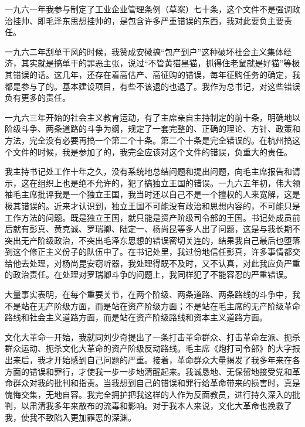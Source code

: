 \begin{maonote}
一九六一年我参与制定了工业企业管理条例（草案）七十条，这个文件不是强调政治挂帅、即毛泽东思想挂帅的，是包含许多严重错误的东西，我对此要负主要责任。

一九六二年刮单干风的时候，我赞成安徽搞“包产到户”这种破坏社会主义集体经济，其实就是搞单干的罪恶主张，说过“不管黄猫黑猫，抓得住老鼠就是好猫”等极其错误的话。这几年，还存在着高估产、高征购的错误，每年征购任务的确定，我都是参与了的。基本建设项目，有些不该退的也退了。我作为总书记，对这些错误负有更多的责任。

一九六三年开始的社会主义教育运动，有了主席亲自主持制定的前十条，明确地以阶级斗争、两条道路的斗争为纲，规定了一套完整的、正确的理论、方针、政策和方法，完全没有必要再搞一个第二个十条。第二个十条是完全错误的。在杭州搞这个文件的时候，我是参加了的，我完全应该对这个文件的错误，负重大的责任。

我主持书记处工作十年之久，没有系统地总结问题和提出问题，向毛主席报告和请示，这在组织上也是绝不允许的，犯了搞独立王国的错误。一九六五年初，伟大领袖毛主席批评我是一个独立王国，我当时还以自己不是一个擅权的人来宽解，这是极其错误的。近来才认识到，独立王国不可能没有政治和思想内容的，不可能只是工作方法的问题。既是独立王国，就只能是资产阶级司令部的王国。书记处成员前后就有彭真、黄克诚、罗瑞卿、陆定一、杨尚昆等多人出了问题，这是与我长期不突出无产阶级政治，不突出毛泽东思想的错误密切关连的，结果我自己最后也堕落到这个修正主义份子的队伍中了。在书记处里，我过份地信任彭真，许多事情都交给他去处理，对杨尚昆安窃听器，我处理得既不及时，又不认真，对此我应负严重的政治责任。在处理对罗瑞卿斗争的问题上，我同样犯了不能容忍的严重错误。

大量事实表明，在每个重要关节，在两个阶级、两条道路、两条路线的斗争中，我不是站在无产阶级方面，而是站在资产阶级方面；不是站在毛主席的无产阶级革命路线和社会主义道路方面，而是站在资产阶级路线和资本主义道路方面。

文化大革命一开始，我就同刘少奇提出了一条打击革命群众、打击革命左派、扼杀群众运动、扼杀文化大革命的资产阶级反动路线。毛主席《炮打司令部》的大字报出来后，我才开始感到自己问题的严重。接着，革命群众大量揭发了我多年来在各方面的错误和罪行，才使我一步一步地清醒起来。我诚恳地、无保留地接受党和革命群众对我的批判和指责。当我想到自己的错误和罪行给革命带来的损害时，真是愧悔交集，无地自容。我完全拥护把我这样的人作为反面教员，进行持久深入的批判，以肃清我多年来散布的流毒和影响。对于我本人来说，文化大革命也挽救了我，使我不致陷入更加罪恶的深渊。


\end{maonote}
